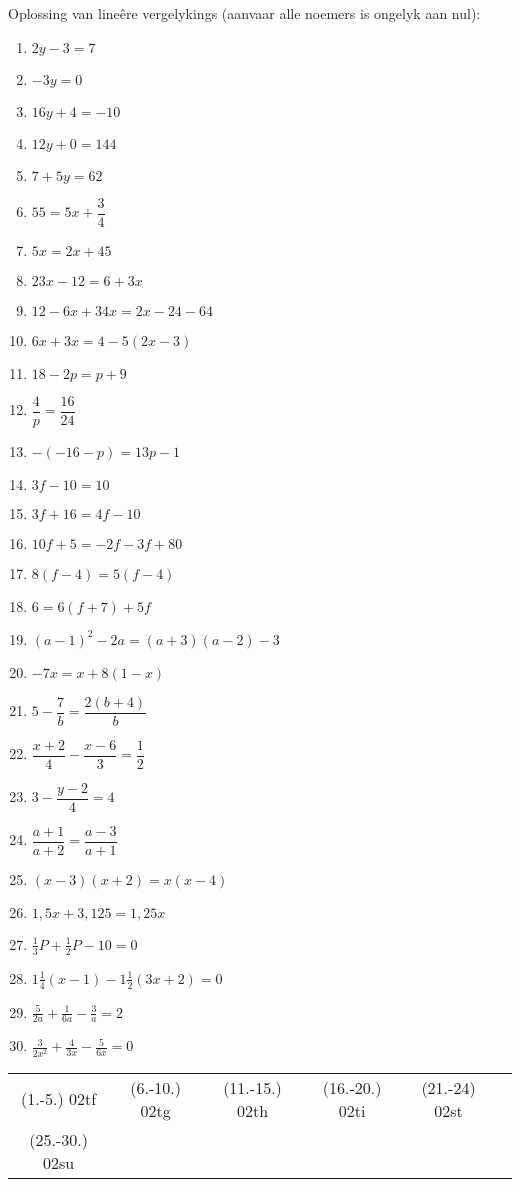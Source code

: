 \begin{exercises}{}
{Oplossing van lineêre vergelykings (aanvaar alle noemers is ongelyk aan nul):

\begin{multicols}{2}
\begin{enumerate}[itemsep=6pt, label=\textbf{\arabic*}. ] 
\item   $2y-3=7$
\item   $-3y=0$        
\item   $16y+4=-10$        
\item   $12y+0=144$
\item   $7+5y=62$       
\item   $55=5x+\dfrac{3}{4}$ 
\item   $5x=2x+45$        
\item   $23x-12=6+3x$
\item   $12-6x+34x=2x-24-64$
\item   $6x+3x=4-5(2x-3)$
\item   $18-2p=p+9$   
\item   $\dfrac{4}{p}=\dfrac{16}{24}$
\item   $-(-16-p)=13p-1$
\item   $3f-10=10$
\item   $3f+16=4f-10$
\item   $10f+5=-2f-3f+80$
\item   $8(f-4)=5(f-4)$
\item  $6=6(f+7)+5f$      
\item $(a-1)^{2} - 2a = (a+3)(a-2) - 3$
\item $-7x = x+8(1-x)$ 
\item $5-\dfrac{7}{b} = \dfrac{2(b+4)}{b}$
\item $\dfrac{x+2}{4} - \dfrac{x-6}{3} = \dfrac{1}{2}$
\item $ 3 - \dfrac{y-2}{4} = 4$
\item $ \dfrac{a+1}{a+2} = \dfrac{a-3}{a+1}$
\item $(x-3)(x+2)=x(x-4)$
\item $1,5x+3,125=1,25x$
\item $\frac{1}{3}P + \frac{1}{2}P - 10 = 0$
\item $1 \frac{1}{4} (x-1)-1\frac{1}{2}(3x+2)=0$
\item $\frac{5}{2a}+\frac{1}{6a}-\frac{3}{a}=2$
\item $\frac{3}{2x^2}+\frac{4}{3x}-\frac{5}{6x}=0$  
\end{enumerate}
\end{multicols}
\practiceinfo
\par 
\par \begin{tabular}[h]{cccccc}
(1.-5.) 02tf &  
(6.-10.) 02tg &  
(11.-15.) 02th &  
(16.-20.) 02ti & 
(21.-24) 02st \\
(25.-30.) 02su & \end{tabular}
}
\end{exercises}


